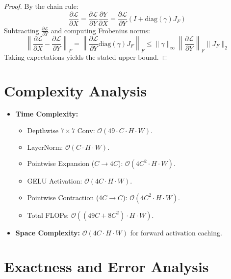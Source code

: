 \documentclass[11pt,a4paper]{article}
\theoremstyle{definition}
\begin{document}
\begin{proof}
By the chain rule:
\begin{equation}
\frac{\partial \mathcal{L}}{\partial X} = \frac{\partial \mathcal{L}}{\partial Y} \frac{\partial Y}{\partial X} = \frac{\partial \mathcal{L}}{\partial Y} \left( I + \text{diag}(\gamma) J_F \right)
\end{equation}
Subtracting $\frac{\partial \mathcal{L}}{\partial Y}$ and computing Frobenius norms:
\begin{equation}
\left\| \frac{\partial \mathcal{L}}{\partial X} - \frac{\partial \mathcal{L}}{\partial Y} \right\|_F = \left\| \frac{\partial \mathcal{L}}{\partial Y} \text{diag}(\gamma) J_F \right\|_F \le \|\gamma\|_{\infty} \left\| \frac{\partial \mathcal{L}}{\partial Y} \right\|_F \|J_F\|_2
\end{equation}
Taking expectations yields the stated upper bound.
\end{proof}

\section{Complexity Analysis}

\begin{itemize}
    \item \textbf{Time Complexity:}
    \begin{itemize}
        \item Depthwise $7 \times 7$ Conv: $\mathcal{O}(49 \cdot C \cdot H \cdot W)$.
        \item LayerNorm: $\mathcal{O}(C \cdot H \cdot W)$.
        \item Pointwise Expansion ($C \to 4C$): $\mathcal{O}(4C^2 \cdot H \cdot W)$.
        \item GELU Activation: $\mathcal{O}(4C \cdot H \cdot W)$.
        \item Pointwise Contraction ($4C \to C$): $\mathcal{O}(4C^2 \cdot H \cdot W)$.
        \item Total FLOPs: $\mathcal{O}\left( (49C + 8C^2) \cdot H \cdot W \right)$.
    \end{itemize}
    \item \textbf{Space Complexity:} $\mathcal{O}(4C \cdot H \cdot W)$ for forward activation caching.
\end{itemize}

\section{Exactness and Error Analysis}
\end{document}

